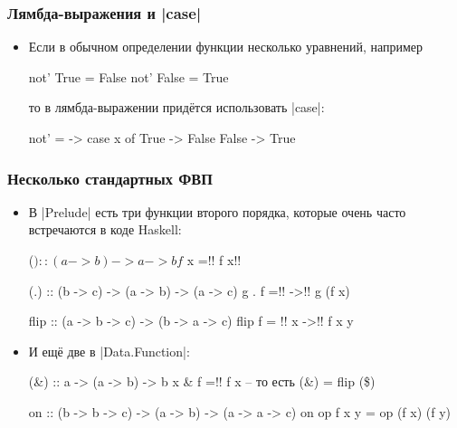 \documentclass[10pt]{beamer}
\begin{document}
\begin{frame}[fragile]
  \frametitle{Лямбда-выражения и \haskinline|case|}
  \begin{itemize}
    \item Если в обычном определении функции несколько уравнений, например
          \begin{haskell}
            not' True  = False
            not' False = True
          \end{haskell}
          то в лямбда-выражении придётся использовать \haskinline|case|:\pause
          \begin{haskell}
            not' = \x -> case x of
                True  -> False
                False -> True
          \end{haskell}
  \end{itemize}
\end{frame}

\begin{frame}[fragile]
  \frametitle{Несколько стандартных ФВП}
  \begin{itemize}
    \item В \haskinline|Prelude| есть три функции второго порядка, которые очень часто встречаются в коде Haskell:
          \begin{haskell}
            ($) :: (a -> b) -> a -> b
            f $ x =!\pause! f x!\pause!

            (.) :: (b -> c) -> (a -> b) -> (a -> c)
            g . f =!\pause! \x ->!\pause! g (f x)

            flip :: (a -> b -> c) -> (b -> a -> c)
            flip f = !\pause! \y x ->!\pause! f x y
          \end{haskell}
    \item И ещё две в \haskinline|Data.Function|:
          \begin{haskell}
            (&) :: a -> (a -> b) -> b
            x & f =!\pause! f x   -- то есть (\&) = flip (\$)

            on :: (b -> b -> c) -> (a -> b) -> 
                (a -> a -> c)
            on op f x y = op (f x) (f y)
          \end{haskell}
  \end{itemize}
\end{frame}
\end{document}
